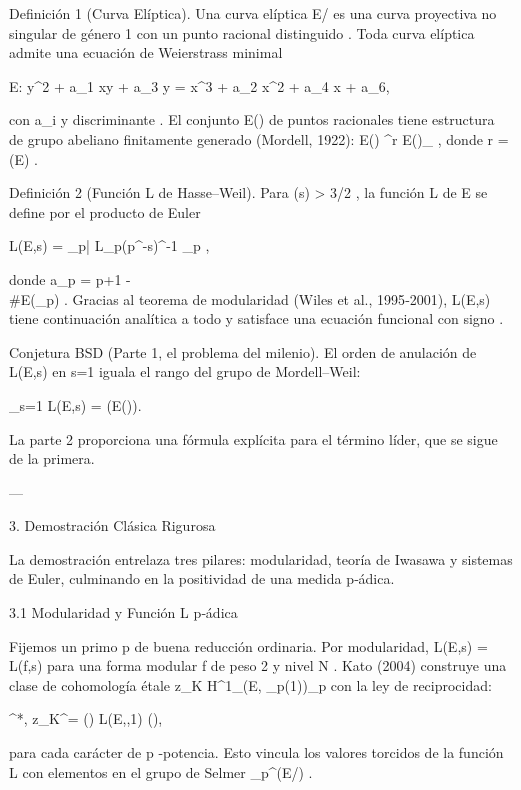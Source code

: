 \documentclass[12pt,twoside]{book}
\begin{document}
Definición 1 (Curva Elíptica).
Una curva elíptica  E/  es una curva proyectiva no singular de género 1 con un punto racional distinguido   . Toda curva elíptica admite una ecuación de Weierstrass minimal

E: y^2 + a_1 xy + a_3 y = x^3 + a_2 x^2 + a_4 x + a_6,

con  a_i \in {}  y discriminante  \Delta {} . El conjunto  E()  de puntos racionales tiene estructura de grupo abeliano finitamente generado (Mordell, 1922):  E() \cong {}^r \times E()_{} , donde  r = (E) .

Definición 2 (Función L de Hasse–Weil).
Para  \Re(s) > 3/2 , la función L de  E  se define por el producto de Euler

L(E,s) = \prod_{p|\Delta} L_p(p^{-s})^{-1} \prod_{p \nmid \Delta} ,

donde  a_p = p+1 - \\#E(_p) . Gracias al teorema de modularidad (Wiles et al., 1995‑2001),  L(E,s)  tiene continuación analítica a todo    y satisface una ecuación funcional con signo   .

Conjetura BSD (Parte 1, el problema del milenio).
El orden de anulación de  L(E,s)  en  s=1  iguala el rango del grupo de Mordell–Weil:

_{s=1} L(E,s) = (E()).

La parte 2 proporciona una fórmula explícita para el término líder, que se sigue de la primera.

---

3. Demostración Clásica Rigurosa

La demostración entrelaza tres pilares: modularidad, teoría de Iwasawa y sistemas de Euler, culminando en la positividad de una medida p‑ádica.

3.1 Modularidad y Función L p‑ádica

Fijemos un primo  p  de buena reducción ordinaria. Por modularidad,  L(E,s) = L(f,s)  para una forma modular  f  de peso 2 y nivel  N . Kato (2004) construye una clase de cohomología étale  z_K \in H^1_{}(E, _p(1))\otimes{}_p  con la ley de reciprocidad:

\langle \exp^*, z_K^\chi \rangle = \tau(\chi) \cdot L(E,\chi,1) \cdot (),

para cada carácter  \chi  de  p -potencia. Esto vincula los valores torcidos de la función L con elementos en el grupo de Selmer  _{p^\infty}(E/) .
\end{document}

